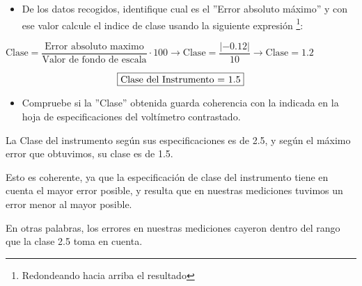 \begin{itemize}
  \item De los datos recogidos, identifique cual es el ''Error absoluto máximo'' y con ese valor calcule el indice de clase usando la siguiente expresión \footnote{Redondeando hacia arriba el resultado}:
\end{itemize}

$\text{Clase} = \dfrac{\text{Error absoluto maximo}}{\text{Valor de fondo de escala}} \cdot 100 \rightarrow \text{Clase} = \dfrac{\left|-0.12\right|}{10} \rightarrow \text{Clase} = 1.2$

$$\framebox{\text{Clase del Instrumento} = 1.5}$$

\begin{itemize}
  \item Compruebe si la ''Clase'' obtenida guarda coherencia con la indicada en la hoja de especificaciones del voltímetro contrastado.
\end{itemize}

La Clase del instrumento según sus especificaciones es de 2.5, y según el máximo error que obtuvimos, su clase es de 1.5.

Esto es coherente, ya que la especificación de clase del instrumento tiene en cuenta el mayor error posible, y resulta que en nuestras mediciones tuvimos un error menor al mayor posible.

En otras palabras, los errores en nuestras mediciones cayeron dentro del rango que la clase 2.5 toma en cuenta.
